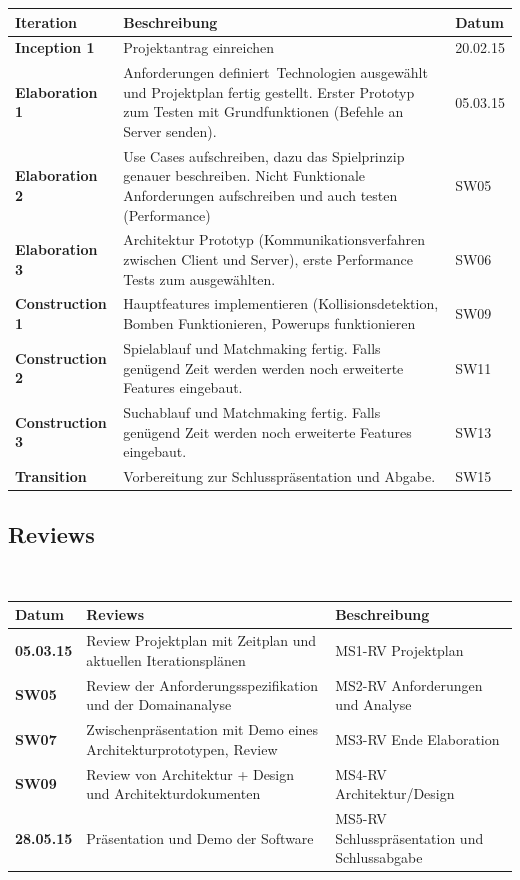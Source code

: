 \documentclass[11pt]{scrartcl}
\begin{document}
\begin{table}[h]
\begin{tabularx}{\textwidth}{l X l}
\textbf{Iteration} & \textbf{Beschreibung} & \textbf{Datum} \\
\hline
\textbf{Inception 1} & Projektantrag einreichen & 20.02.15 \\
\hline
\textbf{Elaboration 1} & Anforderungen definiert\, Technologien ausgewählt 
und Projektplan fertig gestellt. Erster Prototyp zum Testen mit Grundfunktionen (Befehle an Server senden). & 05.03.15 \\
\hline
\textbf{Elaboration 2} & Use Cases aufschreiben, dazu das Spielprinzip genauer beschreiben. 
Nicht Funktionale Anforderungen aufschreiben 
und auch testen (Performance) & SW05 \\
\hline
\textbf{Elaboration 3} & Architektur Prototyp (Kommunikationsverfahren 
zwischen Client und Server), 
erste Performance Tests zum ausgewählten. & SW06 \\
\hline
\textbf{Construction 1} & Hauptfeatures implementieren
 (Kollisionsdetektion, Bomben Funktionieren, Powerups funktionieren & SW09 \\
\hline
\textbf{Construction 2} & Spielablauf und Matchmaking fertig. 
Falls genügend Zeit werden werden noch erweiterte Features eingebaut. & SW11 \\
\hline
\textbf{Construction 3} & Suchablauf und Matchmaking fertig. Falls genügend Zeit werden
 noch erweiterte Features eingebaut. & SW13 \\
\hline
\textbf{Transition} & Vorbereitung zur Schlusspräsentation 
und Abgabe. & SW15 \\
\hline
\end{tabularx}
\end{table}

\subsection{Reviews}
\label{sec:Reviews}
\begin{table}[h]
\begin{tabularx}{\textwidth}{l X X}
\textbf{Datum} & \textbf{Reviews} & \textbf{Beschreibung} \\
\hline
\textbf{05.03.15} & Review Projektplan mit Zeitplan 
und aktuellen Iterationsplänen & MS1-RV Projektplan \\
\hline
\textbf{SW05} & Review der Anforderungsspezifikation
 und der Domainanalyse & MS2-RV Anforderungen 
 und Analyse \\
\hline
\textbf{SW07} & Zwischenpräsentation mit Demo eines
Architekturprototypen, Review & MS3-RV 
Ende Elaboration \\
\hline
\textbf{SW09} & Review von Architektur + Design
 und Architekturdokumenten & MS4-RV Architektur/Design \\
\hline
\textbf{28.05.15} & Präsentation und Demo der Software
& MS5-RV Schlusspräsentation und Schlussabgabe \\
\hline
\end{tabularx}
\end{table}
\end{document}
